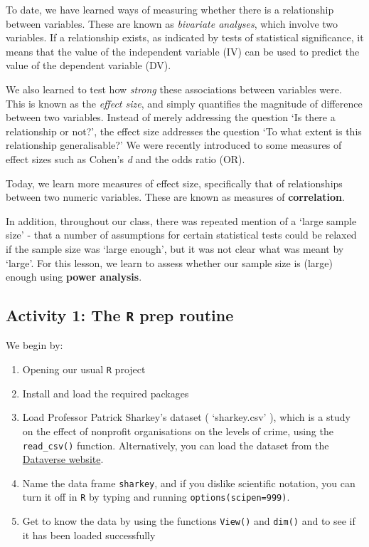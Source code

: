 \documentclass[
]{book}
\begin{document}
To date, we have learned ways of measuring whether there is a relationship between variables. These are known as \emph{bivariate analyses}, which involve two variables. If a relationship exists, as indicated by tests of statistical significance, it means that the value of the independent variable (IV) can be used to predict the value of the dependent variable (DV).

We also learned to test how \emph{strong} these associations between variables were. This is known as the \emph{effect size}, and simply quantifies the magnitude of difference between two variables. Instead of merely addressing the question `Is there a relationship or not?', the effect size addresses the question `To what extent is this relationship generalisable?' We were recently introduced to some measures of effect sizes such as Cohen's \emph{d} and the odds ratio (OR).

Today, we learn more measures of effect size, specifically that of relationships between two numeric variables. These are known as measures of \textbf{correlation}.

In addition, throughout our class, there was repeated mention of a `large sample size' - that a number of assumptions for certain statistical tests could be relaxed if the sample size was `large enough', but it was not clear what was meant by `large'. For this lesson, we learn to assess whether our sample size is (large) enough using \textbf{power analysis}.

\hypertarget{activity-1-the-r-prep-routine}{%
\subsection{\texorpdfstring{Activity 1: The \texttt{R} prep routine}{Activity 1: The R prep routine}}\label{activity-1-the-r-prep-routine}}

We begin by:

\begin{enumerate}
\def\labelenumi{\arabic{enumi}.}
\item
  Opening our usual \texttt{R} project
\item
  Install and load the required packages
\item
  Load Professor Patrick Sharkey's dataset ( `sharkey.csv' ), which is a study on the effect of nonprofit organisations on the levels of crime, using the \texttt{read\_csv()} function. Alternatively, you can load the dataset from the \href{https://dataverse.harvard.edu/dataset.xhtml?persistentId=doi:10.7910/DVN/46WIH0}{Dataverse website}.
\item
  Name the data frame \texttt{sharkey}, and if you dislike scientific notation, you can turn it off in \texttt{R} by typing and running \texttt{options(scipen=999)}.
\item
  Get to know the data by using the functions \texttt{View()} and \texttt{dim()} and to see if it has been loaded successfully
\end{enumerate}
\end{document}
